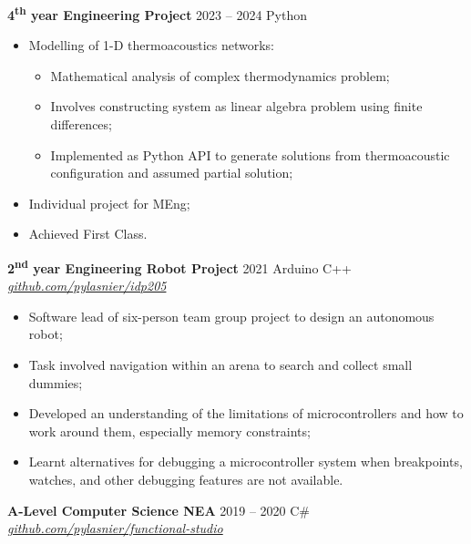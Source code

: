 \documentclass[
  11pt,
  a4paper,
]{article}
\providecommand{\tightlist}{%
  \setlength{\itemsep}{0pt}\setlength{\parskip}{0pt}}
\newcommand{\itemspace}{0.8ex}
\begin{document}
\vspace{\itemspace}

\textbf{4\textsuperscript{th} year Engineering Project} \textbar{} 2023
– 2024 \textbar{} Python

\begin{itemize}
\tightlist
\item
  Modelling of 1-D thermoacoustics networks:

  \begin{itemize}
  \tightlist
  \item
    Mathematical analysis of complex thermodynamics problem;
  \item
    Involves constructing system as linear algebra problem using finite
    differences;
  \item
    Implemented as Python API to generate solutions from thermoacoustic
    configuration and assumed partial solution;
  \end{itemize}
\item
  Individual project for MEng;
\item
  Achieved First Class.
\end{itemize}

\pagebreak

\vspace{\itemspace}

\textbf{2\textsuperscript{nd} year Engineering Robot Project} \textbar{}
2021 \textbar{} Arduino C++ \textbar{}
\href{https://github.com/pylasnier/idp205}{\emph{github.com/pylasnier/idp205}}

\begin{itemize}
\tightlist
\item
  Software lead of six-person team group project to design an autonomous
  robot;
\item
  Task involved navigation within an arena to search and collect small
  dummies;
\item
  Developed an understanding of the limitations of microcontrollers and
  how to work around them, especially memory constraints;
\item
  Learnt alternatives for debugging a microcontroller system when
  breakpoints, watches, and other debugging features are not available.
\end{itemize}

\vspace{\itemspace}

\textbf{A-Level Computer Science NEA} \textbar{} 2019 – 2020 \textbar{}
C\# \textbar{}
\href{https://github.com/pylasnier/functional-studio}{\emph{github.com/pylasnier/functional-studio}}
\end{document}
